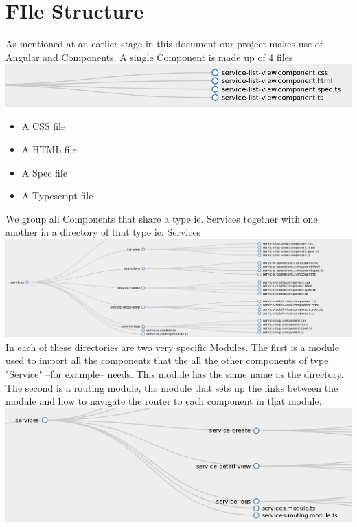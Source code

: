 \documentclass[a4paper]{article}
\begin{document}
\section{FIle Structure}
As mentioned at an earlier stage in this document our project makes use of Angular and Components. 
A single Component is made up of 4 files\\ 
\includegraphics[scale=0.5]{component.png}\\
\begin{itemize}
	\item A CSS file
    \item A HTML file
    \item A Spec file
    \item A Typescript file
\end{itemize}
\pagebreak
We group all Components that share a type ie. Services together with one another in a directory of that type ie. Services\\
\includegraphics[scale=0.4]{service_directory.png}\\
In each of these directories are two very specific Modules. The first is a module used to import all the components 
that the all the other components of type "Service" --for example-- needs. This module has the same name 
as the directory. The second is a routing module, the module that sets up the links between the module and how 
to navigate the router to each component in that module.\\
\includegraphics[scale=0.4]{routing_modules.png}\\
\end{document}
